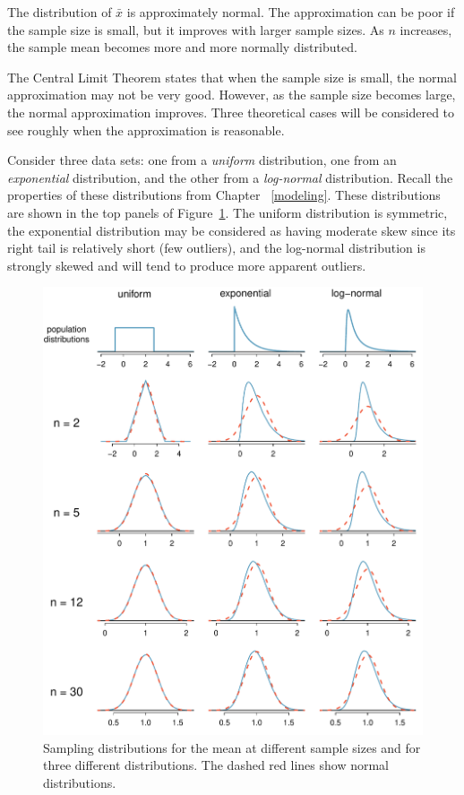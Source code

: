 \begin{termBox}{
The distribution of $\bar{x}$ is approximately normal. The approximation can be poor if the sample size is small, but it improves with larger sample sizes. As $n$ increases, the sample mean becomes more and more normally distributed.}
\end{termBox}

The Central Limit Theorem states that when the sample size is small, the normal approximation may not be very good. However, as the sample size becomes large, the normal approximation improves. Three theoretical cases will be considered to see roughly when the approximation is reasonable.

Consider three data sets: one from a \emph{uniform} distribution, one from an \emph{exponential} distribution, and the other from a \emph{log-normal} distribution. Recall the properties of these distributions from Chapter ~\ref{modeling}. These distributions are shown in the top panels of Figure~\ref{cltSimulations}. The uniform distribution is symmetric, the exponential distribution may be considered as having moderate skew since its right tail is relatively short (few outliers), and the log-normal distribution is strongly skewed and will tend to produce more apparent outliers.

\begin{figure}
   \centering
   \includegraphics[width=\textwidth]{ch_inference_foundations_oi_biostat/figures/cltSimulations/cltSimulations}
   \caption{Sampling distributions for the mean at different sample sizes and for three different distributions. The dashed red lines show normal distributions.}
   \label{cltSimulations}
\end{figure}

